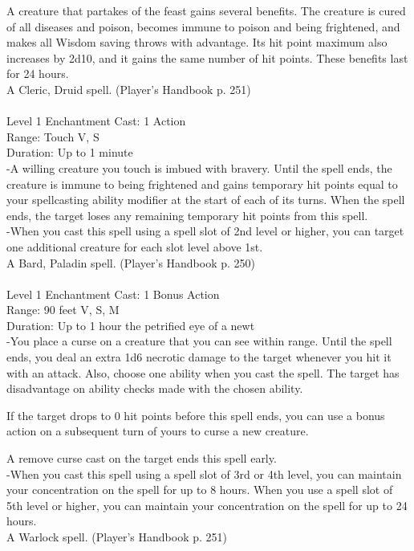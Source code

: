 \documentclass[10pt,twocolumn]{report}
\begin{document}
A creature that partakes of the feast gains several benefits. The creature is cured of all diseases and poison, becomes immune to poison and being frightened, and makes all Wisdom saving throws with advantage. Its hit point maximum also increases by 2d10, and it gains the same number of hit points. These benefits last for 24 hours.\\
A Cleric, Druid spell. (Player's Handbook p. 251) \\


 \\
Level 1 \quad Enchantment \quad Cast: 1 Action\\
Range: Touch \quad V, S\\
Duration: Up to 1 minute \quad \\
-A willing creature you touch is imbued with bravery.
Until the spell ends, the creature is immune to being frightened and gains temporary hit points equal to your spellcasting ability modifier at the start of each of its turns. When the spell ends, the target loses any remaining temporary hit points from this spell.\\
-When you cast this spell using a spell slot of 2nd level or higher, you can target one additional creature for each slot level above 1st.\\
A Bard, Paladin spell. (Player's Handbook p. 250) \\


 \\
Level 1 \quad Enchantment \quad Cast: 1 Bonus Action\\
Range: 90 feet \quad V, S, M\\
Duration: Up to 1 hour \quad the petrified eye of a newt\\
-You place a curse on a creature that you can see within range. Until the spell ends, you deal an extra 1d6 necrotic damage to the target whenever you hit it with an attack. Also, choose one ability when you cast the spell. The target has disadvantage on ability checks made with the chosen ability.

If the target drops to 0 hit points before this spell ends, you can use a bonus action on a subsequent turn of yours to curse a new creature.

A remove curse cast on the target ends this spell early.\\
-When you cast this spell using a spell slot of 3rd or 4th level, you can maintain your concentration on the spell for up to 8 hours.
When you use a spell slot of 5th level or higher, you can maintain your concentration on the spell for up to 24 hours.\\
A Warlock spell. (Player's Handbook p. 251) \\
\end{document}
